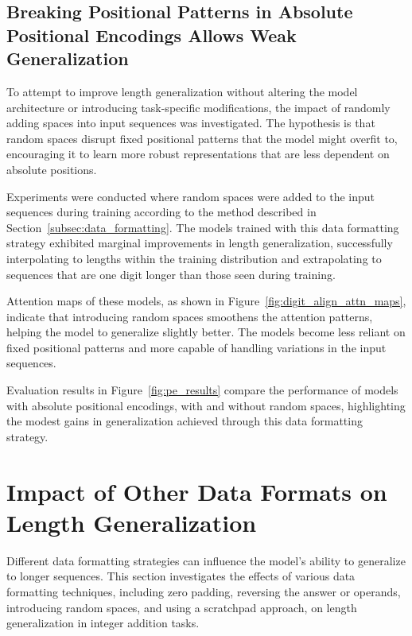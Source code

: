 \subsection{Breaking Positional Patterns in Absolute Positional Encodings Allows Weak Generalization}

To attempt to improve length generalization without altering the model architecture or introducing task-specific modifications, the impact of randomly adding spaces into input sequences was investigated. The hypothesis is that random spaces disrupt fixed positional patterns that the model might overfit to, encouraging it to learn more robust representations that are less dependent on absolute positions.

Experiments were conducted where random spaces were added to the input sequences during training according to the method described in Section~\ref{subsec:data_formatting}. The models trained with this data formatting strategy exhibited marginal improvements in length generalization, successfully interpolating to lengths within the training distribution and extrapolating to sequences that are one digit longer than those seen during training.

Attention maps of these models, as shown in Figure~\ref{fig:digit_align_attn_maps}, indicate that introducing random spaces smoothens the attention patterns, helping the model to generalize slightly better. The models become less reliant on fixed positional patterns and more capable of handling variations in the input sequences.

Evaluation results in Figure~\ref{fig:pe_results} compare the performance of models with absolute positional encodings, with and without random spaces, highlighting the modest gains in generalization achieved through this data formatting strategy.

\section{Impact of Other Data Formats on Length Generalization}\label{sec:other_data_formats_length_generalization}

Different data formatting strategies can influence the model's ability to generalize to longer sequences. This section investigates the effects of various data formatting techniques, including zero padding, reversing the answer or operands, introducing random spaces, and using a scratchpad approach, on length generalization in integer addition tasks.


